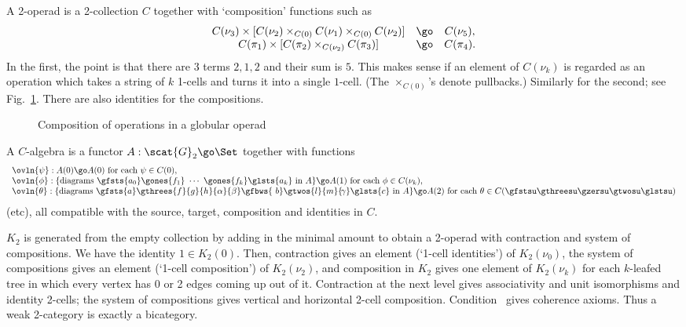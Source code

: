 A 2-operad is a 2-collection $C$ together with `composition' functions such as 
\[
\begin{array}{ccc}
C(\nu_3) \times [C(\nu_2) \times_{C(0)} C(\nu_1) \times_{C(0)} C(\nu_2)] 
&\go &
C(\nu_5), \\
C(\pi_1) \times [C(\pi_2) \times_{C(\nu_2)} C(\pi_3)] &\go & C(\pi_4).
\end{array}
\]
In the first, the point is that there are $3$ terms $2,1,2$ and their sum is
$5$.  This makes sense if an element of $C(\nu_k)$ is regarded as an
operation which takes a string of $k$ 1-cells and turns it into a single
$1$-cell.  (The $\times_{C(0)}$'s denote pullbacks.)  Similarly for the
second; see Fig.~\ref{fig:op-comp-b}.  There are also identities for the
compositions.
%
\begin{figure}
\caption{Composition of operations in a globular operad}
\label{fig:op-comp-b}
\end{figure}
%
A $C$-algebra is a functor $A: \scat{G}_2 \go \Set$ together with functions 
\[
\begin{array}{l}
\ovln{\psi}:	A(0) \go A(0) 
\textrm{ for each } \psi \in C(0),
\\
\ovln{\phi}: 	\{ \textrm{diagrams } \gfsts{a_0}\gones{f_1}\ \cdots \
\gones{f_k} \glsts{a_k} \textrm{ in } A \} \go A(1)			
\textrm{ for each } \phi \in C(\nu_k),
\\
\ovln{\theta}:	\{ \textrm{diagrams }
\gfsts{a}%
\gthrees{f}{g}{h}{\alpha}{\beta}%
\gfbws{\ b}\gtwos{l}{m}{\!\gamma}\glsts{c} 
\textrm{ in } A \} \go A(2)
\textrm{ for each } \theta \in C(\gfstsu\gthreesu\gzersu\gtwosu\glstsu)
\end{array}
\]
(etc), all compatible with the source, target, composition and identities in
$C$.

$K_2$ is generated from the empty collection by adding in the minimal amount
to obtain a 2-operad with contraction and system of compositions.  We have
the identity $1\in K_2(0)$.  Then, contraction gives an element (`1-cell
identities') of $K_2(\nu_0)$, the system of compositions gives an element
(`1-cell composition') of $K_2(\nu_2)$, and composition in $K_2$ gives one
element of $K_2(\nu_k)$ for each $k$-leafed tree in which every vertex has 0
or 2 edges coming up out of it.  Contraction at the next level gives
associativity and unit isomorphisms and identity 2-cells; the system of
compositions gives vertical and horizontal 2-cell composition.
Condition~ gives coherence axioms.  Thus a weak 2-category
is exactly a bicategory.



